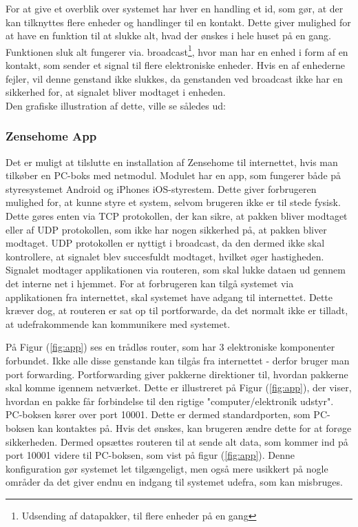 For at give et overblik over systemet har hver en handling et id, som gør, at der kan tilknyttes flere enheder og handlinger til en kontakt. Dette giver mulighed for at have en funktion til at slukke alt, hvad der ønskes i hele huset på en gang. Funktionen sluk alt fungerer via. broadcast\footnote{Udsending af datapakker, til flere enheder på en gang}, hvor man har en enhed i form af en kontakt, som sender et signal til flere elektroniske enheder. Hvis en af enhederne fejler, vil denne genstand ikke slukkes, da genstanden ved broadcast ikke har en sikkerhed for, at signalet bliver modtaget i enheden. \\

Den grafiske illustration af dette, ville se således ud:


\subsubsection{Zensehome App}
Det er muligt at tilslutte en installation af Zensehome til internettet, hvis man tilkøber en PC-boks med netmodul. Modulet har en app, som fungerer både på styresystemet Android og iPhones iOS-styrestem. Dette giver forbrugeren mulighed for, at kunne styre et system, selvom brugeren ikke er til stede fysisk. Dette gøres enten via TCP protokollen, der kan sikre, at pakken bliver modtaget eller af UDP protokollen, som ikke har nogen sikkerhed på, at pakken bliver modtaget. UDP protokollen er nyttigt i broadcast, da den dermed ikke skal kontrollere, at signalet blev succesfuldt modtaget, hvilket øger hastigheden. Signalet modtager applikationen via routeren, som skal lukke dataen ud gennem det interne net i hjemmet. For at forbrugeren kan tilgå systemet via applikationen fra internettet, skal systemet have adgang til internettet. Dette kræver dog, at routeren er sat op til portforwarde, da det normalt ikke er tilladt, at udefrakommende kan kommunikere med systemet.

På Figur (\ref{fig:app}) ses en trådløs router, som har 3 elektroniske komponenter forbundet. Ikke alle disse genstande kan tilgås fra internettet - derfor bruger man port forwarding. Portforwarding giver pakkerne direktioner til, hvordan pakkerne skal komme igennem netværket. Dette er illustreret på Figur (\ref{fig:app}), der viser, hvordan en pakke får forbindelse til den rigtige "computer/elektronik udstyr".\\ PC-boksen kører over port 10001. Dette er dermed standardporten, som PC-boksen kan kontaktes på. Hvis det ønskes, kan brugeren ændre dette for at forøge sikkerheden. Dermed opsættes routeren til at sende alt data, som kommer ind på port 10001 videre til PC-boksen, som vist på figur (\ref{fig:app}). Denne konfiguration gør systemet let tilgængeligt, men også mere usikkert på nogle områder da det giver endnu en indgang til systemet udefra, som kan misbruges.